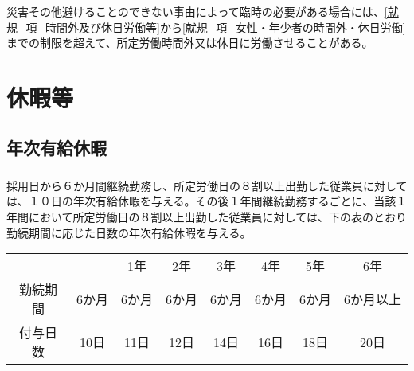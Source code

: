 \documentclass{jsarticle}
\begin{document}
\subsubsection{}
\label{就規_項_天災地変等}
災害その他避けることのできない事由によって臨時の必要がある場合には、\ref{就規_項_時間外及び休日労働等}から\ref{就規_項_女性・年少者の時間外・休日労働}までの制限を超えて、所定労働時間外又は休日に労働させることがある。

\section{休暇等}
\label{就規_章_休暇等}

\subsection{年次有給休暇}
\label{就規_条_年次有給休暇}
\subsubsection{}
\label{就規_項_年次有給休暇}
採用日から６か月間継続勤務し、所定労働日の８割以上出勤した従業員に対しては、１０日の年次有給休暇を与える。その後１年間継続勤務するごとに、当該１年間において所定労働日の８割以上出勤した従業員に対しては、下の表のとおり勤続期間に応じた日数の年次有給休暇を与える。
  \begin{table}[htb]
    \centering
    \begin{tabular}{|c|c|c|c|c|c|c|c|} \hline
      & & 1年 & 2年 & 3年 & 4年 & 5年 & 6年 \\
      勤続期間 &  6か月 & 6か月 & 6か月 & 6か月 & 6か月 & 6か月 & 6か月以上 \\ \hline \hline
      付与日数 & 10日 & 11日 & 12日 & 14日 & 16日 & 18日 & 20日 \\ \hline
    \end{tabular}
  \end{table}
\end{document}
